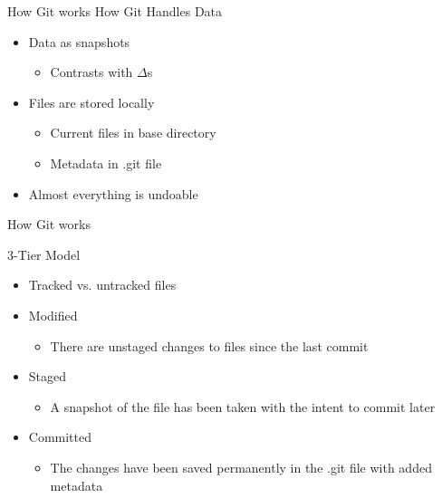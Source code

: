 \documentclass[xcolor=dvipsnames]{beamer}
\begin{document}
\begin{frame}{How Git works}
\vspace{-10mm}
{\LARGE How Git Handles Data}

\begin{itemize}
\item Data as snapshots
\begin{itemize}
\item Contrasts with $\Delta$s
\end{itemize}
\item Files are stored locally
\begin{itemize}
\item Current files in base directory
\item Metadata in .git file
\end{itemize}
\item Almost everything is undoable
\end{itemize}

\end{frame}

\begin{frame}{How Git works}

{\LARGE 3-Tier Model}\\
\begin{itemize}
\item Tracked vs. untracked files

\item {\large Modified}
\begin{itemize}
\item There are unstaged changes to files since the last commit
\end{itemize}

\item {\large Staged}
\begin{itemize}
\item A snapshot of the file has been taken with the intent to commit later
\end{itemize}
\item {\large Committed}
\begin{itemize}
\item The changes have been saved permanently in the .git file with added metadata
\end{itemize}
\end{itemize}

\end{frame}
\end{document}
